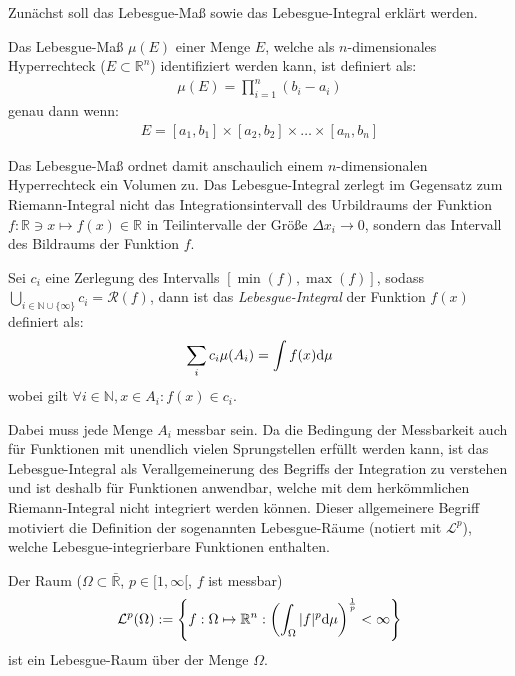 Zunächst soll das Lebesgue-Maß sowie das Lebesgue-Integral erklärt werden. 
\begin{Definition}
    Das Lebesgue-Maß $\mu(E)$ einer Menge $E$, welche als $n$-dimensionales Hyperrechteck ($E\subset \mathbb{R}^n$) identifiziert werden kann, ist definiert als:
    \begin{align*}
        \mu(E)= \prod_{i=1}^{n}{(b_i - a_i)}
    \end{align*}
    genau dann wenn:
    \begin{align*}
        E=[a_1 , b_1] \times [a_2 , b_2] \times \ldots \times [a_n , b_n]
    \end{align*}
\end{Definition}
Das Lebesgue-Maß ordnet damit anschaulich einem $n$-dimensionalen Hyperrechteck ein Volumen zu.
Das Lebesgue-Integral zerlegt im Gegensatz zum Riemann-Integral nicht das Integrationsintervall des Urbildraums der Funktion $f:\mathbb{R} \ni x \mapsto f(x)\in \mathbb{R}$ in Teilintervalle der Größe $\Delta x_i \to 0$, sondern das Intervall des Bildraums der Funktion $f$.
\begin{Definition}
    Sei $c_i$ eine Zerlegung des Intervalls $[\min(f),\max(f)]$, sodass $\bigcup_{i\in \mathbb{N}\cup \{\infty\}}c_i = \mathscr{R}(f)$, dann ist das \emph{Lebesgue-Integral} der Funktion $f(x)$ definiert als:
    \begin{align*}
        \sum_{i}{c_i \mu(A_i)} = \int{f(x) \text{d}{\mu}}
    \end{align*}
    wobei gilt $\forall i \in \mathbb{N},x\in A_i : f(x)\in c_i$.


\end{Definition}
Dabei muss jede Menge $A_i$ messbar sein. 
Da die Bedingung der Messbarkeit auch für Funktionen mit unendlich vielen Sprungstellen erfüllt werden kann, ist das Lebesgue-Integral als Verallgemeinerung des Begriffs der Integration zu verstehen und ist deshalb für Funktionen anwendbar, welche mit dem herkömmlichen Riemann-Integral nicht integriert werden können. Dieser allgemeinere Begriff motiviert die Definition der sogenannten Lebesgue-Räume (notiert mit $\mathcal{L}^p$), welche Lebesgue-integrierbare Funktionen enthalten.
\begin{Definition}
    Der Raum ($\Omega \subset \bar{\mathbb{R}}$, $p\in [1,\infty[$, $f$ ist messbar)
    \begin{align*}
        \mathcal{L}^p (\Omega) := \left\{f:\Omega \mapsto \mathbb{R}^{n} : \left(\int_{\Omega}{|f|^{p}\text{d}{\mu}} \right)^{\frac{1}{p}}< \infty \right\}
    \end{align*}
    ist ein Lebesgue-Raum über der Menge $\Omega$.
\end{Definition}
